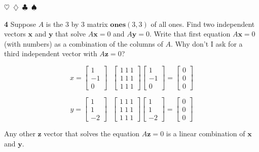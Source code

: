 \documentclass{article}
\newcommand{\sep}{\begin{center}$\heartsuit$~$\diamondsuit$~$\clubsuit$~$\spadesuit$\end{center}}
\newcommand{\vect}[1]{\ensuremath{\boldsymbol{#1}}}
\begin{document}
\sep

\noindent\textbf{4} Suppose $A$ is the 3 by 3 matrix $\mathbf{ones}(3, 3)$ of all ones. Find two independent vectors $\vect{x}$ and $\vect{y}$ that solve $A\vect{x} = 0$ and $A\vect{y} = 0$. Write that first equation $A\vect{x} = 0$ (with numbers) as a combination of the columns of $A$. Why don't I ask for a third independent vector with $A\vect{z} = 0$? 

\begin{displaymath}
  x = \begin{bmatrix} 1 \\ -1 \\ 0 \end{bmatrix}
  ~~~
  \begin{bmatrix} 1 ~ 1 ~ 1 \\ 1 ~ 1 ~ 1 \\ 1 ~ 1 ~ 1 \end{bmatrix} \begin{bmatrix} 1 \\ -1 \\ 0 \end{bmatrix} = \begin{bmatrix} 0 \\ 0 \\ 0 \end{bmatrix}
\end{displaymath}

\begin{displaymath}
  y = \begin{bmatrix} 1 \\ 1 \\ -2 \end{bmatrix}
  ~~~
  \begin{bmatrix} 1 ~ 1 ~ 1 \\ 1 ~ 1 ~ 1 \\ 1 ~ 1 ~ 1 \end{bmatrix} \begin{bmatrix} 1 \\ 1 \\ -2 \end{bmatrix} = \begin{bmatrix} 0 \\ 0 \\ 0 \end{bmatrix}
\end{displaymath}

Any other $\vect{z}$ vector that solves the equation $A\vect{z}=0$ is a linear combination of $\vect{x}$ and $\vect{y}$.
\end{document}
